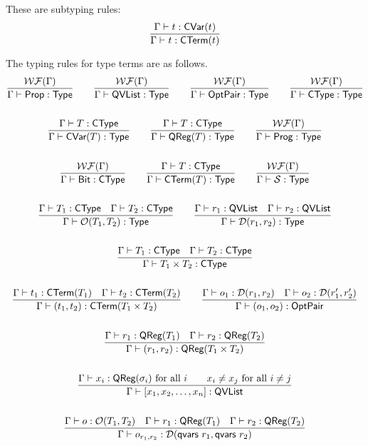 These are subtyping rules:
\begin{gather*}
    \frac{\Gamma \vdash t : \textsf{CVar}(t)}{\Gamma \vdash t : \textsf{CTerm}(t)}
\end{gather*}


The typing rules for type terms are as follows.
\begin{gather*}
    \frac{\mathcal{WF}(\Gamma)}{\Gamma \vdash \textsf{Prop} : \textsf{Type}}
    \qquad
    \frac{\mathcal{WF}(\Gamma)}{\Gamma \vdash \textsf{QVList} : \textsf{Type}}
    \qquad
    \frac{\mathcal{WF}(\Gamma)}{\Gamma \vdash \textsf{OptPair} : \textsf{Type}}
    \qquad
    \frac{\mathcal{WF}(\Gamma)}{\Gamma \vdash \textsf{CType} : \textsf{Type}} \\
    \\
    \frac{\Gamma \vdash T : \textsf{CType}}{\Gamma \vdash \textsf{CVar}(T) : \textsf{Type}}
    \qquad
    \frac{\Gamma \vdash T : \textsf{CType}}{\Gamma \vdash \textsf{QReg}(T) : \textsf{Type}}
    \qquad
    \frac{\mathcal{WF}(\Gamma)}{\Gamma \vdash \textsf{Prog} : \textsf{Type}} \\
    \\
    \frac{\mathcal{WF}(\Gamma)}{\Gamma \vdash \textsf{Bit} : \textsf{CType}}
    \qquad
    \frac{\Gamma \vdash T : \textsf{CType}}{\Gamma \vdash \textsf{CTerm}(T) : \textsf{Type} }
    \qquad
    \frac{\mathcal{WF}(\Gamma)}{\Gamma \vdash \mathcal{S} : \textsf{Type}} \\
    \\
    \frac{\Gamma \vdash T_1 : \textsf{CType} \quad \Gamma \vdash T_2 : \textsf{CType}}{\Gamma \vdash \mathcal{O}(T_1, T_2) : \textsf{Type}}
    \qquad
    \frac{\Gamma \vdash r_1 : \textsf{QVList} \quad \Gamma \vdash r_2 : \textsf{QVList}}{\Gamma \vdash \mathcal{D}(r_1, r_2) : \textsf{Type}} \\
    \\
    \frac{\Gamma \vdash T_1 : \textsf{CType} \quad \Gamma \vdash T_2 : \textsf{CType}}{\Gamma \vdash T_1 \times T_2 : \textsf{CType}} \\
    \\
    \frac{
    \Gamma \vdash t_1 : \textsf{CTerm}(T_1) \quad \Gamma \vdash t_2 : \textsf{CTerm}(T_2)
    }
    {\Gamma \vdash (t_1, t_2) : \textsf{CTerm}(T_1 \times T_2)}
    \qquad
    \frac{\Gamma \vdash o_1 : \mathcal{D}(r_1, r_2) \quad \Gamma \vdash o_2 : \mathcal{D}(r_1', r_2')}{\Gamma \vdash (o_1, o_2) : \textsf{OptPair}} \\
    \\
    \frac{\Gamma \vdash r_1 : \textsf{QReg}(T_1) \quad \Gamma \vdash r_2 : \textsf{QReg}(T_2)}{\Gamma \vdash (r_1, r_2) : \textsf{QReg}(T_1 \times T_2)}
    \\
    \\
    \frac{\Gamma \vdash x_i : \textsf{QReg}(\sigma_i) \text{ for all } i \qquad x_i \neq x_j \text{ for all } i \neq j}{\Gamma \vdash [x_1, x_2, \dots, x_n] : \textsf{QVList}} \\
    \\
    \frac{\Gamma \vdash o : \mathcal{O}(T_1, T_2) \quad \Gamma \vdash r_1 : \textsf{QReg}(T_1) \quad \Gamma \vdash r_2 : \textsf{QReg}(T_2)}{\Gamma \vdash o_{r_1,r_2} : \mathcal{D}(\textsf{qvars}\ r_1, \textsf{qvars}\ r_2)}
\end{gather*}

